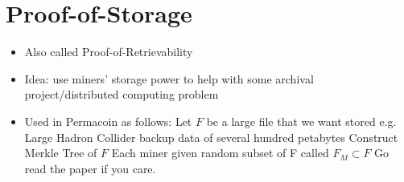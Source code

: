 \documentclass{article}
\begin{document}
\section{Proof-of-Storage}
\begin{itemize}
\item Also called Proof-of-Retrievability
\item Idea: use miners' storage power to help with some archival project/distributed computing problem
\item Used in Permacoin as follows:
\subitem Let $F$ be a large file that we want stored e.g. Large Hadron Collider backup data of several hundred petabytes
\subitem Construct Merkle Tree of $F$
\subitem Each miner given random subset of F called $F_M \subset F$
\subitem Go read the paper if you care.
\end{itemize}
\end{document}

